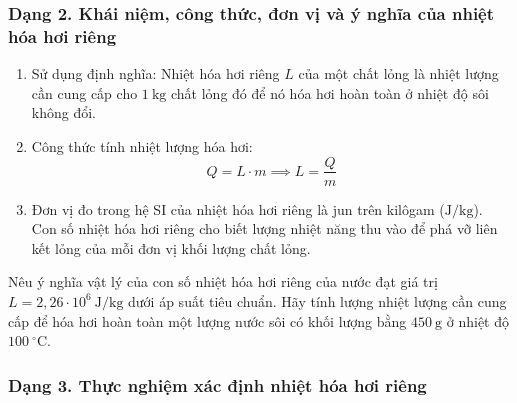 \subsubsection{Dạng 2. Khái niệm, công thức, đơn vị và ý nghĩa của nhiệt hóa hơi riêng}

\begin{phuongphap}
\begin{enumerate}
\item Sử dụng định nghĩa: Nhiệt hóa hơi riêng $L$ của một chất lỏng là nhiệt lượng cần cung cấp cho $1\ \mathrm{kg}$ chất lỏng đó để nó hóa hơi hoàn toàn ở nhiệt độ sôi không đổi.
\item Công thức tính nhiệt lượng hóa hơi:
\[
Q = L \cdot m \implies L = \dfrac{Q}{m}
\]
\item Đơn vị đo trong hệ SI của nhiệt hóa hơi riêng là jun trên kilôgam ($\mathrm{J/kg}$). Con số nhiệt hóa hơi riêng cho biết lượng nhiệt năng thu vào để phá vỡ liên kết lỏng của mỗi đơn vị khối lượng chất lỏng.
\end{enumerate}
\end{phuongphap}
\begin{vidumau}
Nêu ý nghĩa vật lý của con số nhiệt hóa hơi riêng của nước đạt giá trị $L = 2{,}26 \cdot 10^6\ \mathrm{J/kg}$ dưới áp suất tiêu chuẩn. Hãy tính lượng nhiệt lượng cần cung cấp để hóa hơi hoàn toàn một lượng nước sôi có khối lượng bằng $450\ \mathrm{g}$ ở nhiệt độ $100\ ^\circ\mathrm{C}$.
\end{vidumau}

\subsubsection{Dạng 3. Thực nghiệm xác định nhiệt hóa hơi riêng}

